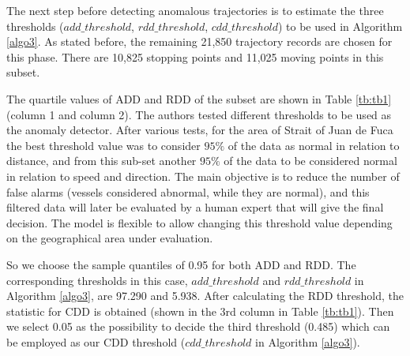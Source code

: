 \documentclass[12pt,glossary]{dalcsthesis}
\begin{document}
The next step before detecting anomalous trajectories is to estimate the three thresholds ($add\_threshold$, $rdd\_threshold$, $cdd\_threshold$) to be used in Algorithm \ref{algo3}. As stated before, the remaining 21,850 trajectory records  are chosen for this phase. There are 10,825 stopping points and 11,025 moving points in this subset.

The quartile values of ADD and RDD of the subset are shown in Table \ref{tb:tb1} (column 1 and column 2).
The authors tested different thresholds to be used as the anomaly detector. After various tests, for the area of Strait of Juan de Fuca the best threshold value was to consider $95\%$ of the data as normal in relation to distance, and from this sub-set another $95\%$ of the data to be considered normal in relation to speed and direction. The main objective is to reduce the number of false alarms (vessels considered abnormal, while they are normal), and this filtered data will later be evaluated by a human expert that will give the final decision. The model is flexible to allow changing this threshold value depending on the geographical area under evaluation.

 So we choose the sample quantiles of 0.95 for both ADD and RDD. The corresponding thresholds in this case, $add\_threshold$ and $rdd\_threshold$ in Algorithm \ref{algo3}, are 97.290 and 5.938. After calculating the RDD threshold, the statistic for CDD is obtained (shown in the 3rd column in Table \ref{tb:tb1}). Then we select 0.05 as the possibility to decide the third threshold (0.485) which can be employed as our CDD threshold ($cdd\_threshold$ in Algorithm \ref{algo3}). 
\end{document}
